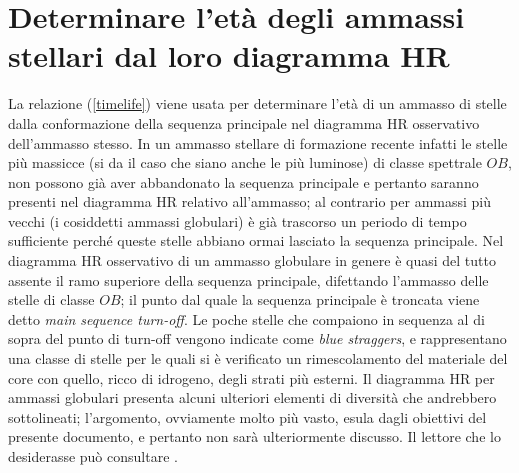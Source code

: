 \section{Determinare l'et\`{a} degli ammassi stellari dal loro diagramma HR}
La relazione (\ref{timelife}) viene usata per determinare l'et\`{a} di un ammasso di stelle dalla conformazione della sequenza principale nel diagramma HR osservativo dell'ammasso stesso.
In un ammasso stellare di formazione recente infatti le stelle più massicce (si da il caso che siano anche le più luminose) di classe spettrale $OB$, non possono gi\`{a} aver abbandonato la sequenza principale e pertanto saranno presenti nel diagramma HR relativo all'ammasso; al contrario per ammassi più vecchi (i cosiddetti ammassi globulari) è gi\`{a} trascorso un periodo di tempo sufficiente perch\'{e} queste stelle abbiano ormai lasciato la sequenza principale.
Nel diagramma HR osservativo di un ammasso globulare in genere è quasi del tutto assente il ramo superiore della sequenza principale, difettando l'ammasso delle stelle di classe $OB$; il punto dal quale la sequenza principale è troncata viene detto \emph{main sequence turn-off}. Le poche stelle che compaiono in sequenza al di sopra del punto di turn-off vengono indicate come \emph{blue straggers}, e rappresentano una classe di stelle per le quali si è verificato un rimescolamento del materiale del core con quello, ricco di idrogeno, degli strati più esterni. Il diagramma HR per ammassi globulari presenta alcuni ulteriori elementi di diversit\`{a} che  andrebbero sottolineati; l'argomento, ovviamente molto più vasto, esula dagli obiettivi del presente documento, e pertanto non sar\`{a} ulteriormente discusso. Il lettore che lo desiderasse può consultare \Cite{rosino}.
